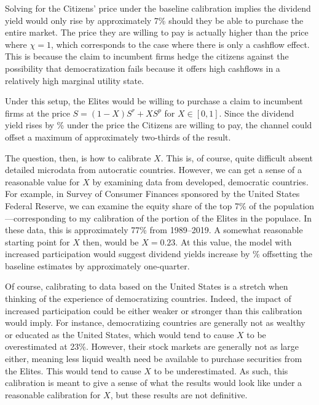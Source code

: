 \documentclass[12pt]{article}
\numberwithin{equation}{section}
\begin{document}
Solving for the Citizens' price under the baseline calibration implies the dividend yield would only rise by approximately 7\% should they be able to purchase the entire market. The price they are willing to pay is actually higher than the price where $\chi=1$, which corresponds to the case where there is only a cashflow effect. This is because the claim to incumbent firms hedge the citizens against the possibility that democratization fails because it offers high cashflows in a relatively high marginal utility state.

Under this setup, the Elites would be willing to purchase a claim to incumbent firms at the price $S = (1-X) S^r + XS^p$ for $X \in [0,1]$. Since the dividend yield rises by \modelCitizenDY\% under the price the Citizens are willing to pay, the channel could offset a maximum of approximately two-thirds of the result.  

The question, then, is how to calibrate $X$. This is, of course, quite difficult absent detailed microdata from autocratic countries. However, we can get a sense of a reasonable value for $X$ by examining data from developed, democratic countries. For example, in Survey of Consumer Finances sponsored by the United States Federal Reserve, we can examine the equity share of the top 7\% of the population---corresponding to my calibration of the portion of the Elites in the populace. In these data, this is approximately 77\% from 1989--2019. A somewhat reasonable starting point for $X$ then, would be $X = 0.23$. At this value, the model with increased participation would suggest dividend yields increase by \modelLimitedPartDY\% offsetting the baseline estimates by approximately one-quarter.

Of course, calibrating to data based on the United States is a stretch when thinking of the experience of democratizing countries. Indeed, the impact of increased participation could be either weaker or stronger than this calibration would imply. For instance, democratizing countries are generally not as wealthy or educated as the United States, which would tend to cause $X$ to be overestimated at 23\%. However, their stock markets are generally not as large either, meaning less liquid wealth need be available to purchase securities from the Elites. This would tend to cause $X$ to be underestimated. As such, this calibration is meant to give a sense of what the results would look like under a reasonable calibration for $X$, but these results are not definitive.
\label{par:finanace_lib_end}
\end{document}
